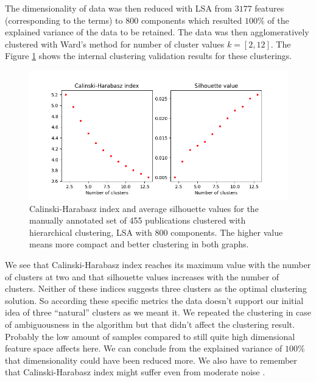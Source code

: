 The dimensionality of data was then reduced with LSA from $3177$
features (corresponding to the terms) to $800$ components which 
resulted $100\%$ of the explained variance of the data to be 
retained. The data was then agglomeratively clustered with Ward's 
method for number of cluster values $k=[2,12]$. 
The Figure \ref{fig:ch-silh01} shows the internal clustering 
validation results for these clusterings. 
\begin{figure}[ht]
  \begin{center}    
\includegraphics[width=11.5cm]{images/c-h-silh-index-plot-455-2_12-800-hierarchical.png}
    \caption{Calinski-Harabasz index and average silhouette values for the
    manually annotated set of 455 publications clustered with 
    hierarchical clustering, LSA with 800 components. The higher 
    value means more compact and better clustering in both 
    graphs.}
    \label{fig:ch-silh01}
    \end{center}
\end{figure}
We see that Calinski-Harabasz index reaches its maximum value 
with the number of clusters at two and that silhouette values 
increases with the number of clusters.
Neither of these indices suggests three clusters as the optimal 
clustering solution. So according these specific metrics the data 
doesn't support our initial idea of three ``natural'' clusters as
we meant it. We repeated the clustering in case of ambiguousness
in the algorithm but that didn't affect the clustering result.
Probably the low amount of samples compared to 
still quite high dimensional feature space affects here. We can 
conclude from the explained variance of $100\%$ that dimensionality
could have been reduced more. We also 
have to remember that Calinski-Harabasz index might suffer even 
from moderate noise \cite{liu_understanding_2010}.

